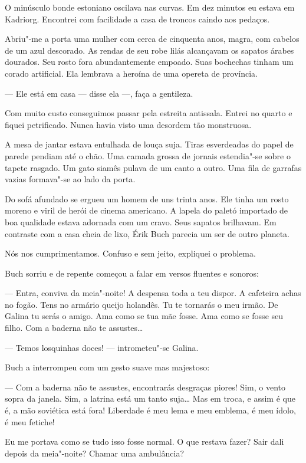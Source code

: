O minúsculo bonde estoniano oscilava nas curvas. Em dez minutos eu
estava em Kadriorg. Encontrei com facilidade a casa de troncos caindo
aos pedaços.

Abriu"-me a porta uma mulher com cerca de cinquenta anos, magra, com
cabelos de um azul descorado. As rendas de seu robe lilás alcançavam os
sapatos árabes dourados. Seu rosto fora abundantemente empoado. Suas
bochechas tinham um corado artificial. Ela lembrava a heroína de uma
opereta de província.

--- Ele está em casa --- disse ela ---, faça a gentileza.

Com muito custo conseguimos passar pela estreita antissala. Entrei no
quarto e fiquei petrificado. Nunca havia visto uma desordem tão
monstruosa.

A mesa de jantar estava entulhada de louça suja. Tiras esverdeadas do
papel de parede pendiam até o chão. Uma camada grossa de jornais
estendia"-se sobre o tapete rasgado. Um gato siamês pulava de um canto a
outro. Uma fila de garrafas vazias formava"-se ao lado da porta.

Do sofá afundado se ergueu um homem de uns trinta anos. Ele tinha um
rosto moreno e viril de herói de cinema americano. A lapela do paletó
importado de boa qualidade estava adornada com um cravo. Seus sapatos
brilhavam. Em contraste com a casa cheia de lixo, Érik Buch parecia um
ser de outro planeta.

Nós nos cumprimentamos. Confuso e sem jeito, expliquei o problema.

Buch sorriu e de repente começou a falar em versos fluentes e sonoros:

--- Entra, conviva da meia"-noite! A despensa toda a teu dispor. A
cafeteira achas no fogão. Tens no armário queijo holandês. Tu te
tornarás o meu irmão. De Galina tu serás o amigo. Ama como se tua mãe
fosse. Ama como se fosse seu filho. Com a baderna não te assustes\ldots{}

--- Temos losquinhas doces! --- intrometeu"-se Galina.

Buch a interrompeu com um gesto suave mas majestoso:

--- Com a baderna não te assustes, encontrarás desgraças piores! Sim, o
vento sopra da janela. Sim, a latrina está um tanto suja\ldots{} Mas em
troca, e assim é que é, a mão soviética está fora! Liberdade é meu lema
e meu emblema, é meu ídolo, é meu fetiche!

Eu me portava como se tudo isso fosse normal. O que restava fazer? Sair
dali depois da meia"-noite? Chamar uma ambulância?

